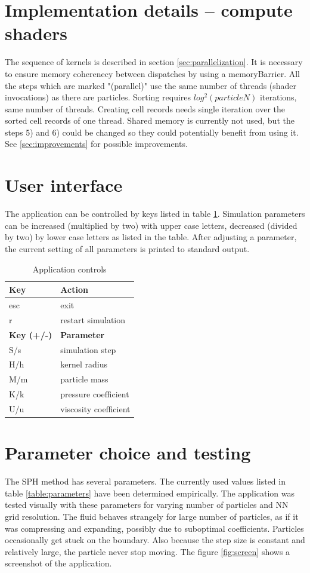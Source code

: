 \documentclass[a4paper,report]{IEEEtran}
\begin{document}
\section{Implementation details -- compute shaders}
The sequence of kernels is described in section \ref{sec:parallelization}. It is necessary to ensure memory coherenecy between dispatches by using a memoryBarrier. All the steps which are marked "(parallel)" use the same number of threads (shader invocations) as there are particles. Sorting requires $log^2(particleN)$ iterations, same number of threads. Creating cell records needs single iteration over the sorted cell records of one thread. Shared memory is currently not used, but the steps 5) and 6) could be changed so they could potentially benefit from using it. See \ref{sec:improvements} for possible improvements.

\section{User interface}
The application can be controlled by keys listed in table \ref{table:controls}. Simulation parameters can be increased (multiplied by two) with upper case letters, decreased (divided by two) by lower case letters as listed in the table. After adjusting a parameter, the current setting of all parameters is printed to standard output.
\begin{table}[h]
	\normalsize
	\centering
	\begin{tabular}{|l|l|}
		\hline
		\textbf{Key} & \textbf{Action} \\
		\hline
		\hline
		esc & exit \\
		r & restart simulation \\
		\hline
		\hline
		\textbf{Key (+/-)} & \textbf{Parameter} \\
		\hline
		\hline
		S/s & simulation step \\
		H/h & kernel radius \\
		M/m & particle mass \\
		K/k & pressure coefficient \\
		U/u & viscosity coefficient \\
		\hline
	\end{tabular}
	\caption{Application controls}
	\label{table:controls}
\end{table}

\section{Parameter choice and testing}
The SPH method has several parameters. The currently used values listed in table \ref{table:parameters} have been determined empirically. The application was tested visually with these parameters for varying number of particles and NN grid resolution. The fluid behaves strangely for large number of particles, as if it was compressing and expanding, possibly due to suboptimal coefficients. Particles occasionally get stuck on the boundary. Also because the step size is constant and relatively large, the particle never stop moving. The figure \ref{fig:screen} shows a screenshot of the application.
\end{document}
